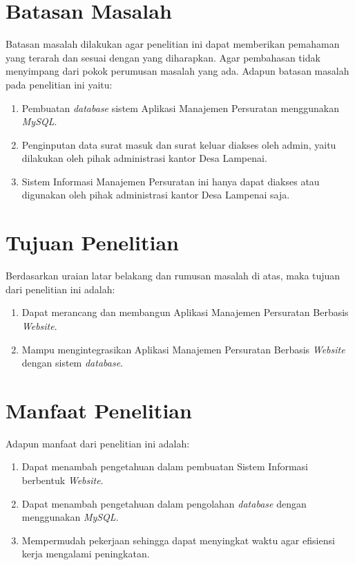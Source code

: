 \section{Batasan Masalah}

Batasan masalah dilakukan agar penelitian ini dapat memberikan pemahaman yang terarah dan sesuai dengan yang diharapkan. Agar pembahasan tidak menyimpang dari pokok perumusan masalah yang ada. Adapun batasan masalah pada penelitian ini yaitu:

\begin{enumerate}[topsep=0pt,itemsep=0pt,partopsep=0pt, parsep=0pt]
    \item Pembuatan \textit{database} sistem Aplikasi Manajemen Persuratan menggunakan \textit{MySQL}.
    \item Penginputan data surat masuk dan surat keluar diakses oleh admin, yaitu dilakukan oleh pihak administrasi kantor Desa Lampenai.
    \item Sistem Informasi Manajemen Persuratan ini hanya dapat diakses atau digunakan oleh pihak administrasi kantor Desa Lampenai saja.
\end{enumerate}

\section{Tujuan Penelitian}

Berdasarkan uraian latar belakang dan rumusan masalah di atas, maka tujuan dari penelitian ini adalah:

\begin{enumerate}[topsep=0pt,itemsep=0pt,partopsep=0pt, parsep=0pt]
    \item Dapat merancang dan membangun Aplikasi Manajemen Persuratan Berbasis \textit{Website}.
    \item Mampu mengintegrasikan Aplikasi Manajemen Persuratan Berbasis \textit{Website} dengan sistem \textit{database}.
\end{enumerate}

\section{Manfaat Penelitian}

Adapun manfaat dari penelitian ini adalah:

\begin{enumerate}[topsep=0pt,itemsep=0pt,partopsep=0pt, parsep=0pt]
    \item Dapat menambah pengetahuan dalam pembuatan Sistem Informasi berbentuk \textit{Website}.
    \item Dapat menambah pengetahuan dalam pengolahan \textit{database} dengan menggunakan \textit{MySQL}.
    \item Mempermudah pekerjaan sehingga dapat menyingkat waktu agar efisiensi kerja mengalami peningkatan.
\end{enumerate}